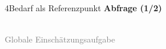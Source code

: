 \documentclass[xcolor=table,9pt,aspectratio=169]{beamer}
\begin{document}
\begin{frame}{\vspace*{10mm}4\hspace*{1em}Bedarf als Referenzpunkt}
\textbf{Abfrage (1/2)}\\
\bigskip
\begin{center}
   \\
   \footnotesize{\textcolor{gray}{Globale Einschätzungsaufgabe}}
\end{center}
\end{frame}
\end{document}

